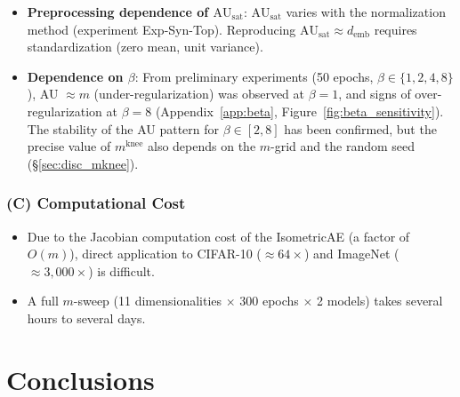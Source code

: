 \documentclass[make,article,submit,pdftex,moreauthors]{Definitions/mdpi}
\newcommand{\AUsat}{\mathrm{AU}_{\mathrm{sat}}}
\newcommand{\mknee}{m^{\mathrm{knee}}}
\newcommand{\demb}{d_{\mathrm{emb}}}
\begin{document}
\begin{itemize}
        confirmed, and we recommend combined use with the second-difference alternative
        method (Appendix~\ref{app:tau_knee}).
  \item \textbf{Preprocessing dependence of $\AUsat$}: $\AUsat$ varies with the
        normalization method (experiment Exp-Syn-Top).
        Reproducing $\AUsat \approx \demb$ requires standardization (zero mean, unit
        variance).
  \item \textbf{Dependence on $\beta$}: From preliminary experiments (50 epochs,
        $\beta \in \{1,2,4,8\}$), AU $\approx m$ (under-regularization) was observed at
        $\beta = 1$, and signs of over-regularization at $\beta = 8$
        (Appendix~\ref{app:beta}, Figure~\ref{fig:beta_sensitivity}).
        The stability of the AU pattern for $\beta \in [2, 8]$ has been confirmed, but
        the precise value of $\mknee$ also depends on the $m$-grid and the random seed
        (\S\ref{sec:disc_mknee}).
\end{itemize}

\subsubsection*{(C) Computational Cost}

\begin{itemize}
  \item Due to the Jacobian computation cost of the IsometricAE (a factor of $O(m)$),
        direct application to CIFAR-10 ($\approx 64\times$) and ImageNet
        ($\approx 3{,}000\times$) is difficult.
  \item A full $m$-sweep (11 dimensionalities $\times$ 300 epochs $\times$ 2 models)
        takes several hours to several days.
\end{itemize}

\section{Conclusions}\label{sec:conclusion}
\end{document}
